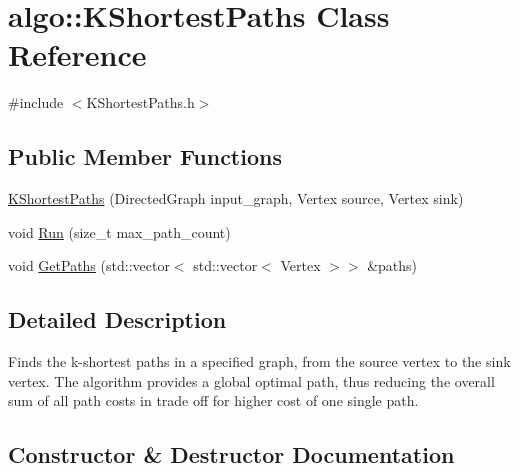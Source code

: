\hypertarget{classalgo_1_1KShortestPaths}{}\section{algo\+:\+:K\+Shortest\+Paths Class Reference}
\label{classalgo_1_1KShortestPaths}


{\ttfamily \#include $<$K\+Shortest\+Paths.\+h$>$}

\subsection*{Public Member Functions}
\begin{DoxyCompactItemize}
\item 
\hyperlink{classalgo_1_1KShortestPaths_ad8654c43c8354f734870ec98783f9756}{K\+Shortest\+Paths} (Directed\+Graph input\+\_\+graph, Vertex source, Vertex sink)
\item 
void \hyperlink{classalgo_1_1KShortestPaths_a4ad79f2618bf3fc36b591ff69efd3c76}{Run} (size\+\_\+t max\+\_\+path\+\_\+count)
\item 
void \hyperlink{classalgo_1_1KShortestPaths_a6af47b5af40e75786924941b3472ada2}{Get\+Paths} (std\+::vector$<$ std\+::vector$<$ Vertex $>$$>$ \&paths)
\end{DoxyCompactItemize}


\subsection{Detailed Description}
Finds the k-\/shortest paths in a specified graph, from the source vertex to the sink vertex. The algorithm provides a global optimal path, thus reducing the overall sum of all path costs in trade off for higher cost of one single path. 

\subsection{Constructor \& Destructor Documentation}
